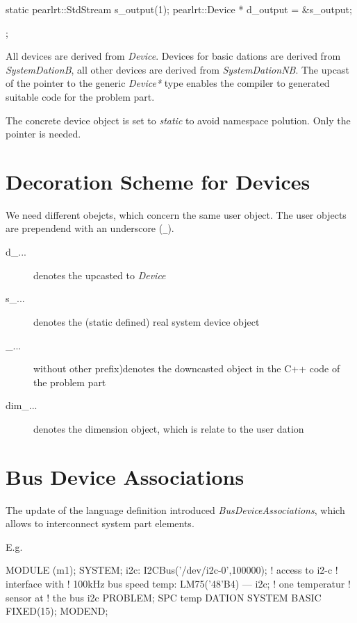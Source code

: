 \begin{CppCode}
static pearlrt::StdStream s_output(1);
       pearlrt::Device * d_output = &s_output;
\end{CppCode};

All devices are derived from {\em Device}.
Devices for basic dations are derived from {\em SystemDationB},
all other devices are derived from {\em SystemDationNB}.
The upcast of the pointer
to the generic {\em Device*} type enables the compiler to generated 
suitable code for the problem part.

The concrete device object is set to {\em static} to avoid namespace polution.
Only the pointer is needed.

\section{Decoration Scheme for Devices}
We need different obejcts, which concern the same user object.
The user objects are prependend with an underscore (\verb|_|).

\begin{description}
\item[d\_...] denotes the upcasted to {\em Device} 
\item[s\_...] denotes the (static defined) real system device object
\item[\_...] without other prefix)denotes the downcasted object in 
     the C++ code of the problem part
\item[dim\_...] denotes the dimension object, which is relate to the 
   user dation
\end{description}

\section{Bus Device Associations}
The update of the language definition introduced {\em BusDeviceAssociations},
which allows to interconnect system part elements.

E.g.
\begin{PEARLCode}
MODULE (m1);
SYSTEM;
   i2c: I2CBus('/dev/i2c-0',100000);  ! access to i2-c
                                      ! interface with 
                                      ! 100kHz bus speed
   temp: LM75('48'B4) --- i2c;        ! one temperatur
                                      ! sensor at
                                      ! the bus i2c
PROBLEM;
   SPC temp DATION SYSTEM BASIC FIXED(15);
MODEND;
\end{PEARLCode}

